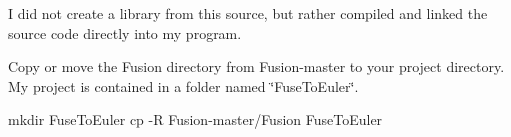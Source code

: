 \begin{DoxyParagraph}{}
I did not create a library from this source, but rather compiled and linked the source code directly into my program. 
\end{DoxyParagraph}
\begin{DoxyParagraph}{}
Copy or move the Fusion directory from Fusion-\/master to your project directory. My project is contained in a folder named \char`\"{}\+Fuse\+To\+Euler\char`\"{}. 
\begin{DoxyCode}
mkdir FuseToEuler
cp -R Fusion-master/Fusion FuseToEuler
\end{DoxyCode}
 
\end{DoxyParagraph}
